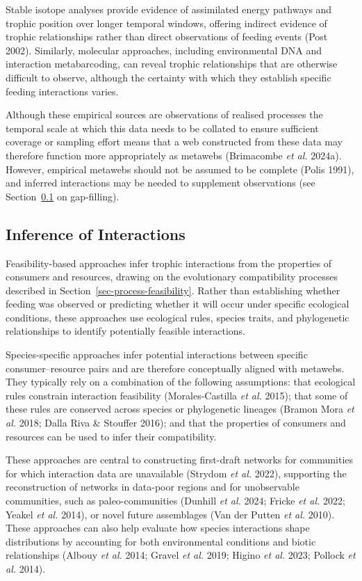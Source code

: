 \documentclass[
]{article}
\begin{document}
Stable isotope analyses provide evidence of assimilated energy pathways
and trophic position over longer temporal windows, offering indirect
evidence of trophic relationships rather than direct observations of
feeding events (Post 2002). Similarly, molecular approaches, including
environmental DNA and interaction metabarcoding, can reveal trophic
relationships that are otherwise difficult to observe, although the
certainty with which they establish specific feeding interactions
varies.

Although these empirical sources are observations of realised processes
the temporal scale at which this data needs to be collated to ensure
sufficient coverage or sampling effort means that a web constructed from
these data may therefore function more appropriately as metawebs
(Brimacombe \emph{et al.} 2024a). However, empirical metawebs should not
be assumed to be complete (Polis 1991), and inferred interactions may be
needed to supplement observations (see
Section~\ref{sec-construct-feasibility} on gap-filling).

\subsection{Inference of Interactions}\label{sec-construct-feasibility}

Feasibility-based approaches infer trophic interactions from the
properties of consumers and resources, drawing on the evolutionary
compatibility processes described in
Section~\ref{sec-process-feasibility}. Rather than establishing whether
feeding was observed or predicting whether it will occur under specific
ecological conditions, these approaches use ecological rules, species
traits, and phylogenetic relationships to identify potentially feasible
interactions.

Species-specific approaches infer potential interactions between
specific consumer--resource pairs and are therefore conceptually aligned
with metawebs. They typically rely on a combination of the following
assumptions: that ecological rules constrain interaction feasibility
(Morales-Castilla \emph{et al.} 2015); that some of these rules are
conserved across species or phylogenetic lineages (Bramon Mora \emph{et
al.} 2018; Dalla Riva \& Stouffer 2016); and that the properties of
consumers and resources can be used to infer their compatibility.

These approaches are central to constructing first-draft networks for
communities for which interaction data are unavailable (Strydom \emph{et
al.} 2022), supporting the reconstruction of networks in data-poor
regions and for unobservable communities, such as paleo-communities
(Dunhill \emph{et al.} 2024; Fricke \emph{et al.} 2022; Yeakel \emph{et
al.} 2014), or novel future assemblages (Van der Putten \emph{et al.}
2010). These approaches can also help evaluate how species interactions
shape distributions by accounting for both environmental conditions and
biotic relationships (Albouy \emph{et al.} 2014; Gravel \emph{et al.}
2019; Higino \emph{et al.} 2023; Pollock \emph{et al.} 2014).
\end{document}
